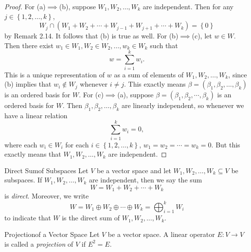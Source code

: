 \documentclass[linearalgebraII]{subfiles}
\begin{document}
    \begin{proof}
        For (a)$\implies$(b), suppose $W_1, W_2, \ldots, W_k$ are independent. Then for any $j\in \left\lbrace 1, 2, \ldots, k \right\rbrace$, 
        \begin{equation*}
            W_j\cap \left( W_1+W_2+\cdots+W_{j-1}+W_{j+1}+\cdots+W_k \right) = \left\lbrace 0 \right\rbrace 
        \end{equation*}
        by Remark 2.14. It follows that (b) is true as well. For (b)$\implies$(c), let $w\in W$. Then there exist $w_1\in W_1, W_2\in W_2, \ldots, w_k\in W_k$ such that
        \begin{equation*}
            w = \sum^{k}_{i=1} w_i.
        \end{equation*}
        This is a unique representation of $w$ as a sum of elements of $W_1, W_2, \ldots, W_k$, since (b) implies that $w_i\notin W_j$ whenever $i\neq j$. This exactly means $\beta = \left( \beta_1, \beta_2, \ldots, \beta_k \right)$ is an ordered basis for $W$. For (c)$\implies$(a), suppose $\beta = \left( \beta_1, \beta_2, \cdots, \beta_k \right)$ is an ordered basis for $W$. Then $\beta_1, \beta_2, \ldots, \beta_k$ are linearly independent, so whenever we have a linear
        relation
        \begin{equation*}
            \sum^{k}_{i=1} w_i = 0,
        \end{equation*}
        where each $w_i\in W_i$ for each $i\in \left\lbrace 1, 2, \ldots, k \right\rbrace$, $w_1 = w_2 = \cdots = w_k = 0$. But this exactly means that $W_1, W_2, \ldots, W_k$ are independent.
    \end{proof}

    \begin{definition}{Direct Sum}{of Subspaces}
        Let $V$ be a vector space and let $W_1, W_2, \ldots, W_k\subseteq V$ be subspaces. If $W_1, W_2, \ldots, W_k$ are independent, then we say the sum
        \begin{equation*}
            W = W_1 + W_2 + \cdots + W_k
        \end{equation*}
        is \emph{direct}. Moreover, we write
        \begin{equation*}
            W = W_1\oplus W_2\oplus \cdots\oplus W_k = \bigoplus^{k}_{i=1} W_i
        \end{equation*}
        to indicate that $W$ is the direct sum of $W_1, W_2, \ldots, W_k$.
    \end{definition}

    \begin{definition}{Projection}{of a Vector Space}
        Let $V$ be a vector space. A linear operator $E:V\to V$ is called a \emph{projection} of $V$ if $E^2 = E$.
    \end{definition}
\end{document}
